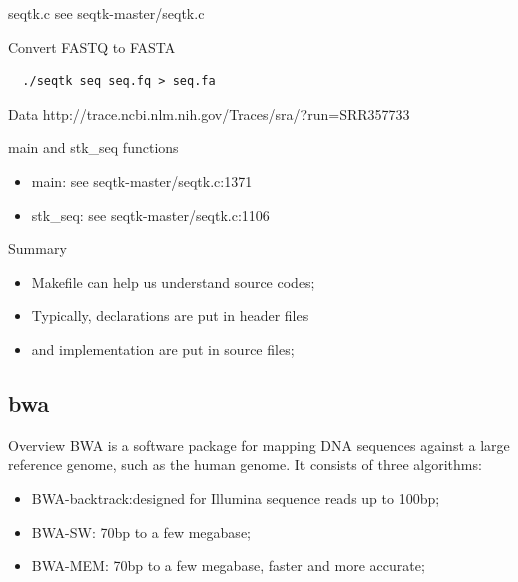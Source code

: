 \documentclass[UTF8]{beamer}
\begin{document}
\begin{frame}[t]{seqtk.c}
  see seqtk-master/seqtk.c
\end{frame}

\begin{frame}[t, fragile]{Convert FASTQ to FASTA}
\begin{verbatim}
  ./seqtk seq seq.fq > seq.fa
\end{verbatim}
\begin{block}{Data}
  http://trace.ncbi.nlm.nih.gov/Traces/sra/?run=SRR357733
\end{block}
\end{frame}

\begin{frame}[t]{main and stk_seq functions}
  \begin{itemize}
    \item main: see seqtk-master/seqtk.c:1371
    \item stk_seq: see seqtk-master/seqtk.c:1106
  \end{itemize}
\end{frame}

\begin{frame}[t]{Summary}
  \begin{itemize}
    \item Makefile can help us understand source codes;
    \item Typically, declarations are put in header files
    \item and implementation are put in source files;
  \end{itemize}
\end{frame}

\subsection{bwa}
\begin{frame}[t]{Overview}
BWA is a software package for mapping DNA sequences against a large reference
genome, such as the human genome. It consists of three algorithms:
\begin{itemize}
\item BWA-backtrack:designed for Illumina sequence reads up to 100bp;
\item BWA-SW: 70bp to a few megabase;
\item BWA-MEM: 70bp to a few megabase, faster and more accurate;
\end{itemize}
\end{frame}
\end{document}
